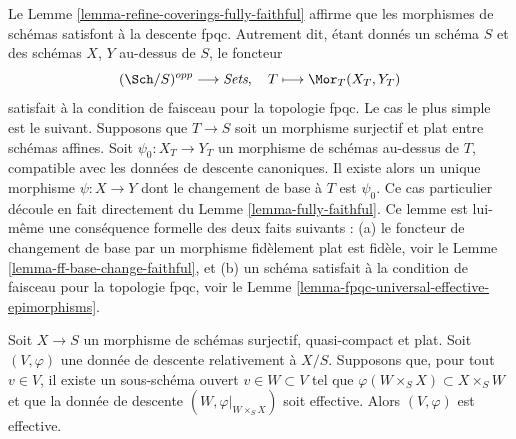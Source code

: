 \begin{remark}
\label{remark-morphisms-of-schemes-satisfy-fpqc-descent}
Le Lemme \ref{lemma-refine-coverings-fully-faithful} affirme que les
morphismes de schémas satisfont à la descente fpqc. Autrement dit, étant
donnés un schéma $S$ et des schémas $X$, $Y$ au-dessus de $S$, le foncteur
$$
(\Sch/S)^{opp} \longrightarrow \textit{Sets},
\quad
T \longmapsto \Mor_T(X_T, Y_T)
$$
satisfait à la condition de faisceau pour la topologie fpqc. Le cas le plus
simple est le suivant. Supposons que $T \to S$ soit un morphisme surjectif et
plat entre schémas affines. Soit $\psi_0 : X_T \to Y_T$ un morphisme de
schémas au-dessus de $T$, compatible avec les données de descente canoniques.
Il existe alors un unique morphisme $\psi : X \to Y$ dont le changement de
base à $T$ est $\psi_0$. Ce cas particulier découle en fait directement du
Lemme \ref{lemma-fully-faithful}. Ce lemme est lui-même une conséquence
formelle des deux faits suivants : (a) le foncteur de changement de base par
un morphisme fidèlement plat est fidèle, voir le
Lemme \ref{lemma-ff-base-change-faithful}, et (b) un schéma satisfait à la
condition de faisceau pour la topologie fpqc, voir le
Lemme \ref{lemma-fpqc-universal-effective-epimorphisms}.
\end{remark}

\begin{lemma}
\label{lemma-effective-for-fpqc-is-local-upstairs}
Soit $X \to S$ un morphisme de schémas surjectif, quasi-compact et plat.
Soit $(V, \varphi)$ une donnée de descente relativement à $X/S$. Supposons que,
pour tout $v \in V$, il existe un sous-schéma ouvert $v \in W \subset V$ tel
que $\varphi(W \times_S X) \subset X \times_S W$ et que la donnée de descente
$(W, \varphi|_{W \times_S X})$ soit effective. Alors $(V, \varphi)$ est
effective.
\end{lemma}

